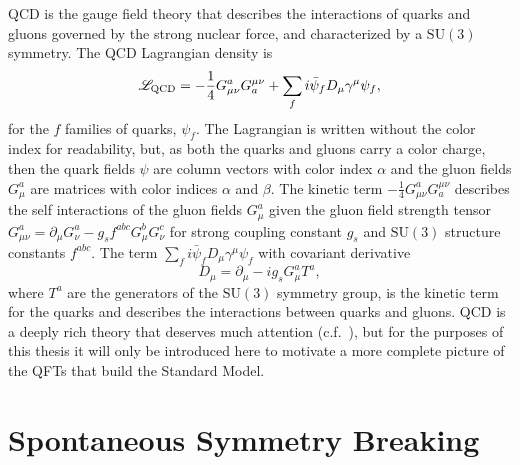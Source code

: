 \gls{QCD} is the gauge field theory that describes the interactions of quarks and gluons governed by the strong nuclear force, and characterized by a $\mathrm{SU}(3)$ symmetry.
The QCD Lagrangian density is
\begin{equation}
 \mathscr{L}_{\textrm{QCD}} = -\frac{1}{4}G_{\mu \nu}^{a} G_{a}^{\mu \nu} + \sum_{f} i \bar{\psi}_{f} D_{\mu} \gamma^{\mu} \psi_{f},
 \label{eq:QCD_Lagrangian}
\end{equation}
for the $f$ families of quarks, $\psi_{f}$.
The Lagrangian is written without the color index for readability, but, as both the quarks and gluons carry a color charge, then the quark fields $\psi$ are column vectors with color index $\alpha$ and the gluon fields $G_{\mu}^{a}$ are matrices with color indices $\alpha$ and $\beta$.
The kinetic term $-\frac{1}{4}G_{\mu \nu}^{a} G_{a}^{\mu \nu}$ describes the self interactions of the gluon fields $G_{\mu}^{a}$ given the gluon field strength tensor $G_{\mu\nu}^{a} = \partial_{\mu} G_{\nu}^{a} - g_{s} f^{abc} G_{\mu}^{b} G_{\nu}^{c}$
for strong coupling constant $g_{s}$ and $\mathrm{SU}(3)$ structure constants $f^{abc}$.
The term $\sum_{f} i \bar{\psi}_{f} D_{\mu} \gamma^{\mu} \psi_{f}$ with covariant derivative
\[
 D_{\mu} = \partial_{\mu} - i g_{s} G_{\mu}^{a} T^{a},
\]
where $T^{a}$ are the generators of the $\mathrm{SU}(3)$ symmetry group, is the kinetic term for the quarks and describes the interactions between quarks and gluons.
QCD is a deeply rich theory that deserves much attention (c.f.~\cite{Campbell:2017hsr}), but for the purposes of this thesis it will only be introduced here to motivate a more complete picture of the QFTs that build the Standard Model.

\section{Spontaneous Symmetry Breaking}\label{section:symmetry_breaking}

